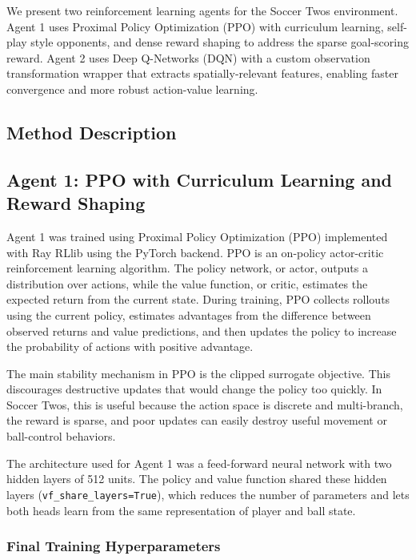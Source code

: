 \documentclass{article}
\begin{document}
We present two reinforcement learning agents for the Soccer Twos environment. Agent 1 uses Proximal Policy Optimization (PPO) with curriculum learning, self-play style opponents, and dense reward shaping to address the sparse goal-scoring reward. Agent 2 uses Deep Q-Networks (DQN) with a custom observation transformation wrapper that extracts spatially-relevant features, enabling faster convergence and more robust action-value learning.


\subsection*{Method Description}

\subsection*{Agent 1: PPO with Curriculum Learning and Reward Shaping}

Agent 1 was trained using Proximal Policy Optimization (PPO) implemented with Ray RLlib using the PyTorch backend. PPO is an on-policy actor-critic reinforcement learning algorithm. The policy network, or actor, outputs a distribution over actions, while the value function, or critic, estimates the expected return from the current state. During training, PPO collects rollouts using the current policy, estimates advantages from the difference between observed returns and value predictions, and then updates the policy to increase the probability of actions with positive advantage.

The main stability mechanism in PPO is the clipped surrogate objective. This discourages destructive updates that would change the policy too quickly. In Soccer Twos, this is useful because the action space is discrete and multi-branch, the reward is sparse, and poor updates can easily destroy useful movement or ball-control behaviors.

The architecture used for Agent 1 was a feed-forward neural network with two hidden layers of 512 units. The policy and value function shared these hidden layers (\texttt{vf\_share\_layers=True}), which reduces the number of parameters and lets both heads learn from the same representation of player and ball state.

\subsubsection*{Final Training Hyperparameters}
\end{document}
